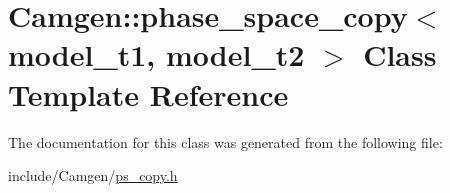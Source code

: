 \hypertarget{a00412}{\section{Camgen\-:\-:phase\-\_\-space\-\_\-copy$<$ model\-\_\-t1, model\-\_\-t2 $>$ Class Template Reference}
\label{a00412}
}


The documentation for this class was generated from the following file\-:\begin{DoxyCompactItemize}
\item 
include/\-Camgen/\hyperlink{a00712}{ps\-\_\-copy.\-h}\end{DoxyCompactItemize}
